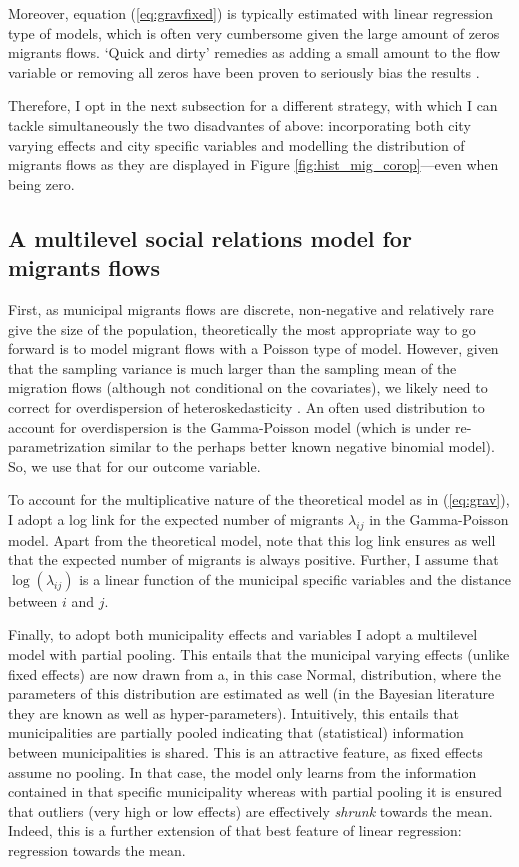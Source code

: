 \documentclass[fleqn,10pt]{SelfArx} %
\begin{document}
Moreover, equation (\ref{eq:gravfixed}) is typically estimated with linear
regression type of models, which is often very cumbersome given the large amount
of zeros migrants flows. `Quick and dirty' remedies as adding a small amount to
the flow variable or removing all zeros have been proven to seriously bias the
results \citep{linders2006estimation, burger2009specification}.

Therefore, I opt in the next subsection for a different strategy, with which I
can tackle simultaneously the two disadvantes of above: incorporating both city
varying effects and city specific variables and modelling the distribution of
migrants flows as they are displayed in Figure \ref{fig:hist_mig_corop}---even when
being zero.

\subsection{A multilevel social relations model for migrants flows}

First, as municipal migrants flows are discrete, non-negative and relatively
rare give the size of the population, theoretically the most appropriate way to
go forward is to model migrant flows with a Poisson type of model. However,
given that the sampling variance is much larger than the sampling mean of the
migration flows (although not conditional on the covariates), we likely need to
correct for overdispersion of heteroskedasticity \citep[][states that
heteroskedasticity (rather than the presence of too many zeros) is responsible
for the main source of bias within gravity models.]{silva2006log}. An often used
distribution to account for overdispersion is the Gamma-Poisson model (which is
under re-parametrization similar to the perhaps better known negative binomial
model). So, we use that for our outcome variable.

To account for the multiplicative nature of the theoretical model as in
(\ref{eq:grav}), I adopt a log link for the expected number of migrants
$\lambda_{ij}$ in the Gamma-Poisson model. Apart from the theoretical model,
note that this log link ensures as well that the expected number of migrants is
always positive. Further, I assume that $\log(\lambda_{ij})$ is a linear
function of the municipal specific variables and the distance between $i$ and
$j$.

Finally, to adopt both municipality effects and variables I adopt a multilevel
model with partial pooling. This entails that the municipal varying effects
(unlike fixed effects) are now drawn from a, in this case Normal, distribution,
where the parameters of this distribution are estimated as well (in the Bayesian
literature they are known as well as hyper-parameters). Intuitively, this
entails that municipalities are partially pooled indicating that (statistical)
information between municipalities is shared. This is an attractive feature, as
fixed effects assume no pooling. In that case, the model only learns from the
information contained in that specific municipality whereas with partial pooling
it is ensured that outliers (very high or low effects) are effectively
\emph{shrunk} towards the mean. Indeed, this is a further extension of that best
feature of linear regression: regression towards the mean.
\end{document}
